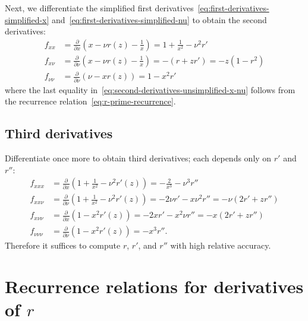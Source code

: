 \documentclass{article}
\begin{document}
Next, we differentiate the simplified first derivatives~\eqref{eq:first-derivatives-simplified-x} and~\eqref{eq:first-derivatives-simplified-nu} to obtain the second derivatives:
%
\begin{align}
  f_{xx}     & = \frac{\partial}{\partial x}\left(x - \nu r(z) - \frac{1}{x}\right) = 1 + \frac{1}{x^2} - \nu^2 r' \label{eq:second-derivatives-unsimplified-x-x} \\
  f_{x\nu}   & = \frac{\partial}{\partial \nu}\left(x - \nu r(z) - \frac{1}{x}\right) = -(r + z r') = -z(1 - r^2) \label{eq:second-derivatives-unsimplified-x-nu} \\
  f_{\nu\nu} & = \frac{\partial}{\partial \nu}\left(\nu - x r(z)\right) = 1 - x^2 r' \label{eq:second-derivatives-unsimplified-nu-nu}
\end{align}
%
where the last equality in~\eqref{eq:second-derivatives-unsimplified-x-nu} follows from the recurrence relation~\eqref{eq:r-prime-recurrence}.

\subsection{Third derivatives}

Differentiate once more to obtain third derivatives; each depends only on $r'$ and $r''$:
%
\begin{align}
  f_{xxx}       & = \frac{\partial}{\partial x}\left(1+\frac{1}{x^2}-\nu^2 r'(z)\right) = -\frac{2}{x^3} - \nu^3 r'' \label{eq:third-derivatives-unsimplified-x-x-x}                                 \\
  f_{xx\nu}     & = \frac{\partial}{\partial \nu}\left(1+\frac{1}{x^2}-\nu^2 r'(z)\right) = -2\nu r' - x\nu^2 r'' = -\nu(2r' + z r'')              \label{eq:third-derivatives-unsimplified-x-x-nu}  \\
  f_{x\nu\nu}   & = \frac{\partial}{\partial x}\left(1 - x^2 r'(z)\right) = -2x r' - x^2\nu r'' = -x(2r' + z r'')                                  \label{eq:third-derivatives-unsimplified-x-nu-nu} \\
  f_{\nu\nu\nu} & = \frac{\partial}{\partial \nu}\left(1 - x^2 r'(z)\right) = -x^3 r''. \label{eq:third-derivatives-unsimplified-nu-nu-nu}
\end{align}
%
Therefore it suffices to compute $r$, $r'$, and $r''$ with high relative accuracy.

\section{Recurrence relations for derivatives of $r$}
\end{document}
